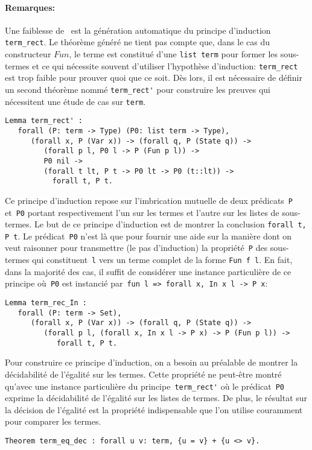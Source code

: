\paragraph{Remarques:}
Une faiblesse de \coq\ est la génération automatique du principe
d'induction \lstinline!term_rect!. Le théorème généré ne tient pas
compte que, dans le cas du constructeur $Fun$, le terme est constitué d'une
\lstinline!list term! pour former les sous-termes et ce qui
nécessite souvent d'utiliser l'hypothèse d'induction:
\lstinline!term_rect! est trop faible pour prouver quoi que ce soit.
Dès lors, il est nécessaire de définir un second théorème nommé \lstinline!term_rect'! pour
construire les preuves qui nécessitent une étude de cas sur \lstinline!term!.
\begin{lstlisting}
Lemma term_rect' : 
   forall (P: term -> Type) (P0: list term -> Type),
      (forall x, P (Var x)) -> (forall q, P (State q)) ->
         (forall p l, P0 l -> P (Fun p l)) ->
         P0 nil ->
         (forall t lt, P t -> P0 lt -> P0 (t::lt)) ->
           forall t, P t.
\end{lstlisting}
Ce principe d'induction repose sur l'imbrication mutuelle de deux prédicats~\lstinline!P! et~\lstinline!P0!
portant respectivement l'un sur les termes et l'autre sur les listes de sous-termes. Le but de ce principe
d'induction est de montrer la conclusion \lstinline!forall t, P t!.
Le prédicat~\lstinline!P0! n'est là que pour fournir une aide sur la manière dont on veut raisonner pour transmettre
(le pas d'induction) la propriété~\lstinline!P! des sous-termes qui constituent~\lstinline!l! vers un terme complet de la forme \lstinline!Fun f l!.
En fait, dans la majorité des cas, il suffit de considérer une instance particulière de ce principe 
où~\lstinline!P0! est instancié par~\lstinline!fun l => forall x, In x l -> P x!:
\begin{lstlisting}
Lemma term_rec_In :
   forall (P: term -> Set),
      (forall x, P (Var x)) -> (forall q, P (State q)) ->
         (forall p l, (forall x, In x l -> P x) -> P (Fun p l)) ->
            forall t, P t.
\end{lstlisting}
Pour construire ce principe d'induction, on a besoin au préalable de montrer la décidabilité de l'égalité
sur les termes. Cette propriété ne peut-être montré qu'avec une instance particulière du principe~\lstinline!term_rect'!
où le prédicat~\lstinline!P0! exprime la décidabilité de l'égalité sur les listes de termes.
De plus, le résultat sur la décision de l'égalité est la propriété indispensable que l'on utilise couramment 
pour comparer les termes. %
\begin{lstlisting}
Theorem term_eq_dec : forall u v: term, {u = v} + {u <> v}.
\end{lstlisting}


